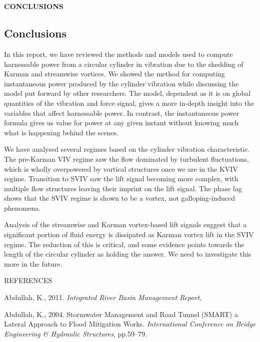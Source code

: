 \documentclass[]{article}
\begin{document}
\hypertarget{section-5}{\section{}\label{section-5}}

\textbf{CONCLUSIONS}

\hypertarget{conclusions}{\subsection{Conclusions}\label{conclusions}}

In this report, we have reviewed the methods and models used to compute
harnessable power from a circular cylinder in vibration due to the
shedding of Karman and streamwise vortices. We showed the method for
computing instantaneous power produced by the cylinder vibration while
discussing the model put forward by other researchers. The model,
dependent as it is on global quantities of the vibration and force
signal, gives a more in-depth insight into the variables that affect
harnessable power. In contrast, the instantaneous power formula gives us
value for power at any given instant without knowing much what is
happening behind the scenes.

We have analysed several regimes based on the cylinder vibration
characteristic. The pre-Karman VIV regime saw the flow dominated by
turbulent fluctuations, which is wholly overpowered by vortical
structures once we are in the KVIV regime. Transition to SVIV saw the
lift signal becoming more complex, with multiple flow structures leaving
their imprint on the lift signal. The phase lag shows that the SVIV
regime is shown to be a vortex, not galloping-induced phenomena.

Analysis of the streamwise and Karman vortex-based lift signals suggest
that a significant portion of fluid energy is dissipated as Karman
vortex lift in the SVIV regime. The reduction of this is critical, and
some evidence points towards the length of the circular cylinder as
holding the answer. We need to investigate this more in the future.

\protect\hypertarget{_Toc461037287}{}{\protect\hypertarget{_Toc461037470}{}{\protect\hypertarget{_Toc41048823}{}{}}}REFERENCES

Abdullah, K., 2011. \emph{Integrated River Basin Management Report},

Abdullah, K., 2004. Stormwater Management and Road Tunnel (SMART) a
Lateral Approach to Flood Mitigation Works. \emph{International
Conference on Bridge Engineering \& Hydraulic Structures}, pp.59--79.
\end{document}
